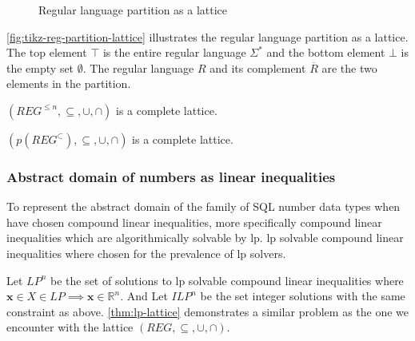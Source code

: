 \begin{figure}[!htb]
    \caption{Regular language partition as a lattice}
    \label{fig:tikz-reg-partition-lattice}
\end{figure}
\autoref{fig:tikz-reg-partition-lattice} illustrates the regular language partition as a lattice. The top element $\top$ is the entire regular language $\Sigma^*$ and the bottom element $\bot$ is the empty set $\emptyset$. The regular language $R$ and its complement $\overline{R}$ are the two elements in the partition.

\begin{theorem}\label{thm:finite-reg-lattice}
    $(REG^{\leq n}, \subseteq, \cup, \cap)$ is a complete lattice.
\end{theorem}

\begin{theorem}\label{thm:reg-partition-lattice}
    $(p(REG^\subset), \subseteq, \cup, \cap)$ is a complete lattice.
\end{theorem}


\subsubsection{Abstract domain of numbers as linear inequalities}\label{subsubsec:abstract_domains_numbers}

To represent the abstract domain of the family of SQL number data types when have chosen compound linear inequalities, more specifically compound linear inequalities which are algorithmically solvable by \gls{lp}.
\gls{lp} solvable compound linear inequalities where chosen for the prevalence of \gls{lp} solvers.

Let $LP^n$ be the set of solutions to \gls{lp} solvable compound linear inequalities where $\mathbf{x} \in X \in LP \implies \mathbf{x} \in \mathbb{R}^n$.
And Let $ILP^n$ be the set integer solutions with the same constraint as above.
\autoref{thm:lp-lattice} demonstrates a similar problem as the one we encounter with the lattice $(REG, \subseteq, \cup, \cap)$.

